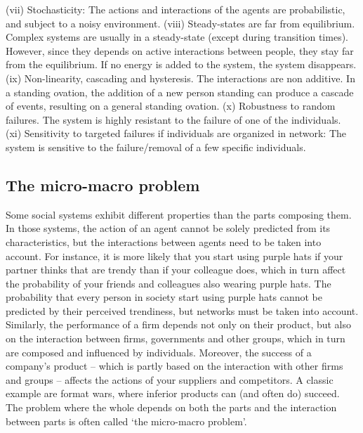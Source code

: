 (vii) Stochasticity: The actions and interactions of the agents are probabilistic, 
and subject to a noisy environment.
(viii) Steady-states are far from equilibrium. Complex systems are usually in a steady-state (except during transition times). However, since they depends on active interactions between people, they stay far from the equilibrium. If no energy is added to the system, the system disappears.
(ix) Non-linearity, cascading and hysteresis. The interactions are non additive. In a standing ovation, the addition of a new person standing can produce a cascade of events, resulting on a general standing ovation.
(x) Robustness to random failures. The system is highly resistant to the failure of one of the individuals. 
(xi) Sensitivity to targeted failures if individuals are organized in network: The system is sensitive to the failure/removal of a few specific individuals. 

\subsection{The micro-macro problem}
Some social systems exhibit different properties than the parts composing them.
In those systems, the action of an agent cannot be solely predicted from its characteristics, 
but the interactions between agents need to be taken into account. 
For instance, it is more likely that you start using purple hats if your partner thinks that are trendy than if your colleague does,
which in turn affect the probability of your friends and colleagues also wearing purple hats.
The probability that every person in society start using purple hats cannot be predicted by their perceived trendiness, 
but networks must be taken into account.
Similarly, the performance of a firm depends not only on their product,
but also on the interaction between firms, governments and other groups, 
which in turn are composed and influenced by individuals.
Moreover, the success of a company's product 
-- which is partly based on the interaction with other firms and groups -- 
affects the actions of your suppliers and competitors.
A classic example are format wars,
where inferior products can (and often do) succeed.
The problem where the whole depends on both the parts and the interaction between parts is often called `the micro-macro problem'.

